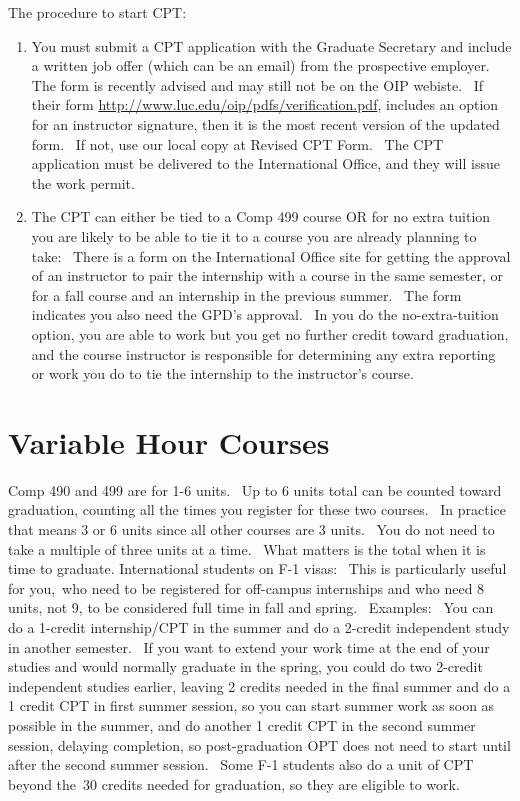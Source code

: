 \documentclass[letterpaper,10pt,english]{sphinxmanual}
\begin{document}
The procedure to start CPT:
\begin{enumerate}
\item {} 
You must submit a CPT application with the Graduate Secretary and
include a written job offer (which can be an email) from the
prospective employer.   The form is recently advised and may still
not be on the OIP webiste.  If their form
\href{http://www.luc.edu/oip/pdfs/verification.pdf}{http://www.luc.edu/oip/pdfs/verification.pdf},
includes an option for an instructor signature, then it is the most
recent version of the updated form.  If not, use our local copy at
Revised CPT Form.  The
CPT application must be delivered to the International Office, and
they will issue the work permit.

\item {} 
The CPT can either be tied to a Comp 499 course OR for no extra
tuition you are likely to be able to tie it to a course you are
already planning to take:  There is a form on the International
Office site for getting the approval of an instructor to pair the
internship with a course in the same semester, or for a fall course
and an internship in the previous summer.  The form indicates you
also need the GPD's approval.  In you do the no-extra-tuition option,
you are able to work but you get no further credit toward graduation,
and the course instructor is responsible for determining any extra
reporting or work you do to tie the internship to the instructor's
course.

\end{enumerate}


\section{Variable Hour Courses}
\label{regulations:variable-hour-courses}
Comp 490 and 499 are for 1-6 units.  Up to 6 units total can be counted
toward graduation, counting all the times you register for these two
courses.  In practice that means 3 or 6 units since all other courses
are 3 units.  You do not need to take a multiple of three units at a
time.  What matters is the total when it is time to graduate.
International students on F-1 visas:  This is particularly useful for
you, who need to be registered for off-campus internships and who need 8
units, not 9, to be considered full time in fall and spring.  Examples:
 You can do a 1-credit internship/CPT in the summer and do a 2-credit
independent study in another semester.  If you want to extend your work
time at the end of your studies and would normally graduate in the
spring, you could do two 2-credit independent studies earlier, leaving 2
credits needed in the final summer and do a 1 credit CPT in first summer
session, so you can start summer work as soon as possible in the summer,
and do another 1 credit CPT in the second summer session, delaying
completion, so post-graduation OPT does not need to start until after
the second summer session.  Some F-1 students also do a unit of CPT
beyond the 30 credits needed for graduation, so they are eligible to
work.
\end{document}
